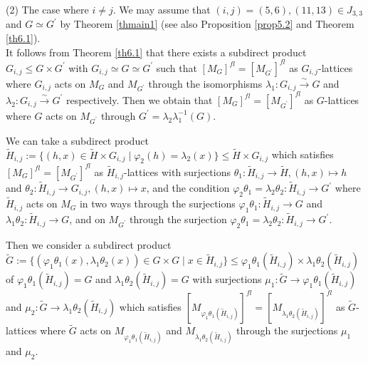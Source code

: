 \documentclass{amsart}
\theoremstyle{plain}
\theoremstyle{definition}
\theoremstyle{remark}
\newcounter{sub}\def\tr{\mbox{tr }}
\begin{document}
{(2) The case where $i\neq j$. 
We may assume that $(i,j)=(5,6), (11,13)\in J_{3,3}$ and 
$G\simeq G^\prime$ by Theorem \ref{thmain1} 
(see also Proposition \ref{prop5.2} and Theorem \ref{th6.1}).\\

It follows from Theorem \ref{th6.1} that there exists a subdirect product 
$G_{i,j}\leq G\times G^\prime$ with $G_{i,j}\simeq G\simeq G^\prime$ 
such that $[M_G]^{fl}=[M_{G^\prime}]^{fl}$ as $G_{i,j}$-lattices 
where $G_{i,j}$ acts on $M_G$ and $M_{G^\prime}$ 
through the isomorphisms $\lambda_1: G_{i,j} \xrightarrow{\sim} G$ 
and $\lambda_2: G_{i,j} \xrightarrow{\sim} G^\prime$ respectively. 
Then we obtain that 
$[M_G]^{fl}=[M_{G^\prime}]^{fl}$ as $G$-lattices 
where $G$ acts on $M_{G^\prime}$ 
through $G^\prime=\lambda_2\lambda_1^{-1}(G)$. 

We can take a subdirect product 
$\widetilde{H}_{i,j}:=\{(h,x)\in \widetilde{H}\times G_{i,j}\mid \varphi_2(h)=\lambda_2(x)\}\leq \widetilde{H}\times G_{i,j}$ 
which satisfies 
$[M_G]^{fl}=[M_{G^\prime}]^{fl}$ as $\widetilde{H}_{i,j}$-lattices 
with surjections 
$\theta_1: \widetilde{H}_{i,j}\rightarrow \widetilde{H}, (h,x)\mapsto h$ and 
$\theta_2: \widetilde{H}_{i,j}\rightarrow G_{i,j}, (h,x)\mapsto x$, 
and the condition 
$\varphi_2\theta_1=\lambda_2\theta_2: 
\widetilde{H}_{i,j}\rightarrow G^\prime$ 
where $\widetilde{H}_{i,j}$ 
acts on $M_G$ in two ways 
through the surjections 
$\varphi_1\theta_1: \widetilde{H}_{i,j}\rightarrow G$
and 
$\lambda_1\theta_2: \widetilde{H}_{i,j}\rightarrow G$, 
and on $M_{G^\prime}$ 
through the surjection 
$\varphi_2\theta_1=\lambda_2\theta_2: 
\widetilde{H}_{i,j}\rightarrow G^\prime$. 

Then we consider a subdirect product 
$\widetilde{G}:=\{(\varphi_1\theta_1(x),\lambda_1\theta_2(x))\in G\times G
\mid x\in \widetilde{H}_{i,j}\}\leq \varphi_1\theta_1(\widetilde{H}_{i,j})
\times 
\lambda_1\theta_2(\widetilde{H}_{i,j})$ of 
$\varphi_1\theta_1(\widetilde{H}_{i,j})=G$ 
and $\lambda_1\theta_2(\widetilde{H}_{i,j})=G$ 
with surjections 
$\mu_1: \widetilde{G}\rightarrow \varphi_1\theta_1(\widetilde{H}_{i,j})$ 
and 
$\mu_2: \widetilde{G}\rightarrow \lambda_1\theta_2(\widetilde{H}_{i,j})$ 
which satisfies 
$[M_{\varphi_1\theta_1(\widetilde{H}_{i,j})}]^{fl}
=[M_{\lambda_1\theta_2(\widetilde{H}_{i,j})}]^{fl}$ 
as $\widetilde{G}$-lattices 
where $\widetilde{G}$ acts on 
$M_{\varphi_1\theta_1(\widetilde{H}_{i,j})}$ 
and 
$M_{\lambda_1\theta_2(\widetilde{H}_{i,j})}$ 
through the surjections $\mu_1$ and $\mu_2$. 

}
\end{document}
